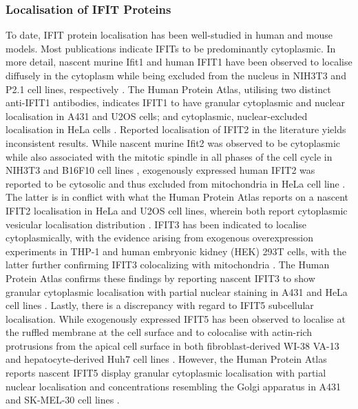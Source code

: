 \subsubsection{Localisation of IFIT Proteins} \label{Localisation of IFIT Proteins}
To date, IFIT protein localisation has been well-studied in human and mouse models. Most publications indicate IFITs to be predominantly cytoplasmic. In more detail, nascent murine Ifit1 and human IFIT1 have been observed to localise diffusely in the cytoplasm while being excluded from the nucleus in NIH3T3 and P2.1 cell lines, respectively \cite{Pichlmair2011IFIT1RNA, Terenzi2008Interferon-inducibleE1}. The Human Protein Atlas, utilising two distinct anti-IFIT1 antibodies, indicates IFIT1 to have granular cytoplasmic and nuclear localisation in A431 and U2OS cells; and cytoplasmic, nuclear-excluded localisation in HeLa cells \cite{Thul2017AProteome}. Reported localisation of IFIT2 in the literature yields inconsistent results. While nascent murine Ifit2 was observed to be cytoplasmic while also associated with the mitotic spindle in all phases of the cell cycle in NIH3T3 and B16F10 cell lines \cite{Saha2006IdentificationProtein}, exogenously expressed human IFIT2 was reported to be cytosolic and thus excluded from mitochondria in HeLa cell line \cite{Stawowczyk2011TheApoptosis}. The latter is in conflict with what the Human Protein Atlas reports on a nascent IFIT2 localisation in HeLa and U2OS cell lines, wherein both report cytoplasmic vesicular localisation distribution \cite{Thul2017AProteome}. IFIT3 has been indicated to localise cytoplasmically, with the evidence arising from exogenous overexpression experiments in THP-1 and human embryonic kidney (HEK) 293T cells, with the latter further confirming IFIT3 colocalizing with mitochondria \cite{Huang2008Interferon-inducedCells, Liu2011IFN-InducedTBK1}. The Human Protein Atlas confirms these findings by reporting nascent IFIT3 to show granular cytoplasmic localisation with partial nuclear staining in A431 and HeLa cell lines \cite{Thul2017AProteome}. Lastly, there is a discrepancy with regard to IFIT5 subcellular localisation. While exogenously expressed IFIT5 has been observed to localise at the ruffled membrane at the cell surface and to colocalise with actin-rich protrusions from the apical cell surface in both fibroblast-derived WI-38 VA-13 and hepatocyte-derived Huh7 cell lines \cite{Katibah2013TRNAIFIT5}. However, the Human Protein Atlas reports nascent IFIT5 display granular cytoplasmic localisation with partial nuclear localisation and concentrations resembling the Golgi apparatus in A431 and SK-MEL-30 cell lines \cite{Thul2017AProteome}. 

